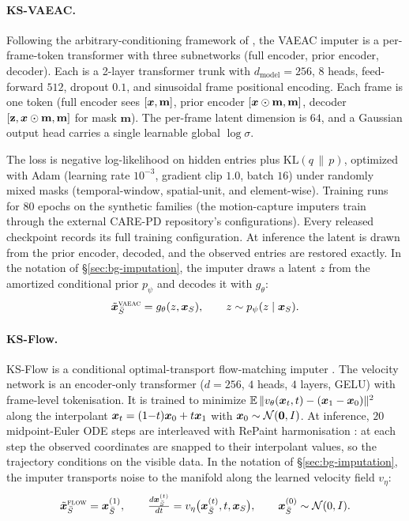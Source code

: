\paragraph{KS-VAEAC.}
Following the arbitrary-conditioning framework of
\citet{ivanov2018variational,olsen2022using}, the VAEAC imputer is a
per-frame-token transformer with three subnetworks (full encoder, prior
encoder, decoder).  Each is a 2-layer transformer trunk with
$d_{\mathrm{model}}{=}256$, $8$ heads, feed-forward $512$, dropout $0.1$,
and sinusoidal frame positional encoding.  Each frame is one token (full
encoder sees $[\bm{x}, \mathbf{m}]$, prior encoder $[\bm{x} \odot \mathbf{m},
\mathbf{m}]$, decoder $[\mathbf{z}, \bm{x} \odot \mathbf{m}, \mathbf{m}]$ for
mask $\mathbf{m}$).  The per-frame latent dimension is $64$, and a Gaussian
output head carries a single learnable global $\log\sigma$.

The loss is negative log-likelihood on hidden entries plus
$\mathrm{KL}(q\,\|\,p)$, optimized with Adam (learning rate $10^{-3}$,
gradient clip $1.0$, batch $16$) under randomly mixed masks
(temporal-window, spatial-unit, and element-wise).  Training runs for $80$
epochs on the synthetic families (the motion-capture imputers train through
the external CARE-PD repository's configurations).  Every released
checkpoint records its full training configuration.  At inference the
latent is drawn from the prior encoder, decoded, and the observed entries
are restored exactly.  In the notation of \S\ref{sec:bg-imputation}, the
imputer draws a latent $z$ from the amortized conditional prior $p_\psi$
and decodes it with $g_\theta$:
\begin{equation}
  \tilde{\bm{x}}_{\bar{S}}^{\textsc{vaeac}} = g_\theta(z, \bm{x}_{S}),
  \qquad z \sim p_\psi(z \mid \bm{x}_{S}).
  \label{eq:generative}
\end{equation}

\paragraph{KS-Flow.}
KS-Flow is a conditional optimal-transport flow-matching imputer
\citep{lipman2023flow,tong2024improving}.  The velocity network is an
encoder-only transformer ($d{=}256$, $4$ heads, $4$ layers, GELU) with
frame-level tokenisation.  It is trained to minimize
$\mathbb{E}\,\lVert v_\theta(\bm{x}_t, t) - (\bm{x}_1 - \bm{x}_0)\rVert^2$ along the
interpolant $\bm{x}_t = (1{-}t)\bm{x}_0 + t\bm{x}_1$ with
$\bm{x}_0 \sim \mathcal{N}(\bm{0}, I)$.  At inference, $20$ midpoint-Euler ODE
steps are interleaved with RePaint harmonisation
\citep{lugmayr2022repaint}: at each step the observed coordinates are
snapped to their interpolant values, so the trajectory conditions on the
visible data.  In the notation of \S\ref{sec:bg-imputation}, the imputer
transports noise to the manifold along the learned velocity field
$v_\eta$:
\begin{equation}
  \tilde{\bm{x}}_{\bar{S}}^{\textsc{flow}} = \bm{x}_{\bar{S}}^{(1)},
  \qquad \tfrac{d\bm{x}_{\bar{S}}^{(t)}}{dt} =
  v_\eta\bigl(\bm{x}_{\bar{S}}^{(t)}, t,  \bm{x}_{S}\bigr),
  \qquad \bm{x}_{\bar{S}}^{(0)} \sim \mathcal{N}(0, I).
\end{equation}

